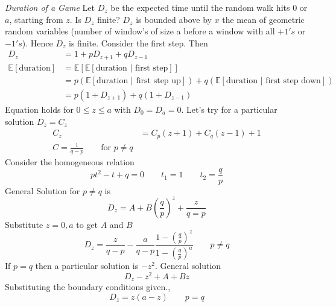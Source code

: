 \documentclass{notes}
\theoremstyle{plain}
\newcommand{\bE}{\mathbb{E}}
\newcommand{\expect}[1]{\bE\!\left[#1\right]}
\begin{document}
\emph{Duration of a Game} \qquad Let $ D_z$ be the expected time until
the random walk hits $0$ or $a$, starting from $z$.  Is $D_z$ finite?
$D_z$ is bounded above by $x$ the mean of geometric random variables
(number of window's of size a before a window with all $+1's$ or
$-1's$). Hence $D_z$ is finite.  Consider the first step. Then
\begin{align*}
D_z &= 1 +pD_{z+1} + qD_{z-1}\\
\expect{\text{duration}}&=\expect{\expect{\text{duration $|$ first step}}}\\
&= p\left(\expect{\text{duration $|$ first step up}} \right) + 
q\left(\expect{\text{duration $|$ first step down}} \right)\\
&= p(1+D_{z+1}) + q (1+D_{z-1})
\end{align*}
Equation holds for $0\le z\le a$ with $D_0=D_a=0$. Let's try for a
particular solution $D_z=C_z$
\begin{align*}
C_z &= C_p(z+1) + C_q(z-1) +1 \\
C= \frac{1}{q-p} \qquad \text{for } p\neq q
\end{align*}
Consider the homogeneous relation
\[
pt^2 -t + q = 0 \qquad t_1=1 \qquad t_2=\frac{q}{p}
\]
General Solution for $ p\neq q$ is
\[
D_z = A + B\left(\frac{q}{p}\right)^z +\frac{z}{q=p}
\]
Substitute $z=0,a$ to get $A$ and $B$
\[
D_z = \frac{z}{q-p} - \frac{a}{q-p}
\frac{1 - \left(\frac{q}{p}\right)^z}{1- \left(\frac{q}{p}\right)^a}
\qquad p\neq q
\]
If $p=q$ then a particular solution is $-z^2$. General solution
\[
D_z - z^2 +A +Bz
\]
Substituting the boundary conditions given.,
\[
D_z = z(a-z) \qquad p=q
\]
\end{document}
